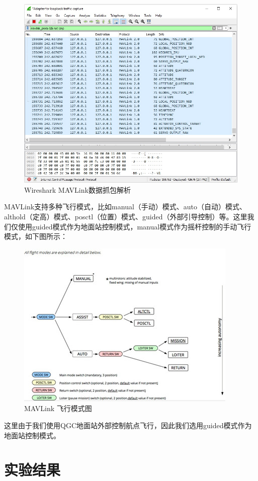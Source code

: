 \begin{figure}[ht]
  \centering
  \includegraphics[width=0.8\linewidth]{./Figure/Mavlink_Wireshark_Decode.jpg}
  \caption{Wireshark MAVLink数据抓包解析}\label{Fig:img11}
\end{figure}

MAVLink支持多种飞行模式，比如manual（手动）模式、auto（自动）模式、althold（定高）模式、posctl（位置）模式、guided（外部引导控制）等。这里我们仅使用guided模式作为地面站控制模式，manual模式作为摇杆控制的手动飞行模式，如下图所示：

\begin{figure}[ht]
  \centering
  \includegraphics[width=0.8\linewidth]{./Figure/Flight_Mode.png}
  \caption{MAVLink 飞行模式图}\label{Fig:img12}
\end{figure}

这里由于我们使用QGC地面站外部控制航点飞行，因此我们选用guided模式作为地面站控制模式。

\chapter{实验结果}

